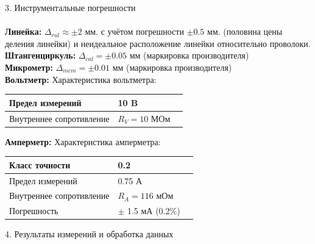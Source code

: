 \documentclass[12pt, a4paper]{article}
\begin{document}
\vspace*{0.5cm}
{\large 3. Инструментальные погрешности \\} \\
\textbf{Линейка: } $\Delta_{rul} \approx \pm 2$ мм. с учётом погрешности $\pm 0.5$ мм. (половина цены деления линейки) и неидеальное расположение линейки относительно проволоки. \\
\textbf{Штангенциркуль: } $\Delta_{cal} = \pm 0.05$ мм (маркировка производителя)                                                                                                  \\
\textbf{Микрометр: } $\Delta_{mcm} = \pm 0.01$ мм (маркировка производителя)                                                                                                      \\    
\textbf{Вольтметр: } Характеристика вольтметра:
                                                                                                                                                            \\      
\begin{center}
\begin{tabular}{ | p{6cm} | p{3.2cm} | p{3cm} | }
    \hline
 Предел измерений & 10 B \\ \hline
 Внутреннее сопротивление & $R_V = 10$ МОм \\ \hline
\end{tabular}
\end{center} 

\newpage
\noindent\textbf{Амперметр: } Характеристика амперметра:                                                                                                                                                   \\      
\begin{center}
\begin{tabular}{ | p{6cm} | p{3.2cm} | p{3cm} | }
    \hline
    Класс точности & 0.2 \\  \hline
 Предел измерений & 0.75 А \\ \hline
 Внутреннее сопротивление & $R_A = 116$ мОм \\ \hline
 Погрешность & $\pm$ 1.5 мА (0.2\%) \\ \hline   
\end{tabular}
\end{center} 
\vspace*{0.3cm}

{\large 4. Результаты измерений и обработка данных \\} 
\end{document}

